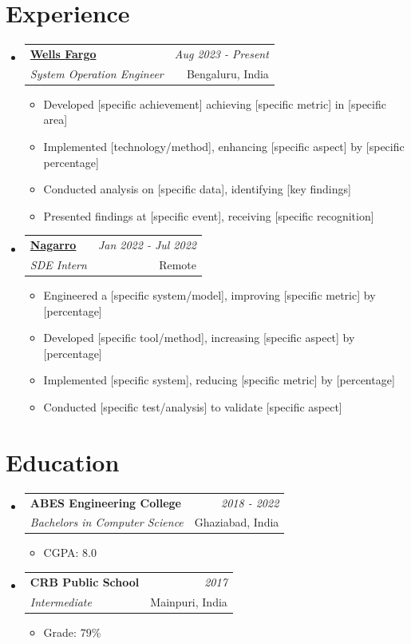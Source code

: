 \documentclass[a4paper,11pt]{article}
\makeatletter
\newcommand{\resumeSubheading}[4]{
\vspace{0.5mm}\item
    \begin{tabular*}{0.98\textwidth}[t]{l@{\extracolsep{\fill}}r}
        \textbf{#1} & \textit{#4} \\
        \textit{\footnotesize{#3}} &  \footnotesize{#2}\\
    \end{tabular*}
    \vspace{-2.4mm}
}
\newcommand{\resumeSubHeadingListStart}{\begin{itemize}[leftmargin=*,labelsep=1mm]}
\newcommand{\resumeItemListStart}{\begin{itemize}[leftmargin=*,labelsep=1mm,itemsep=0.5mm]}
\newcommand{\resumeSubHeadingListEnd}{\end{itemize}\vspace{2mm}}
\newcommand{\resumeItemListEnd}{\end{itemize}\vspace{-2mm}}
\makeatother
\begin{document}
\section{\textbf{Experience}}
\vspace{-0.4mm}
  \resumeSubHeadingListStart
  \resumeSubheading
      {\href{https://www.wellsfargo.com/}{Wells Fargo}}{Bengaluru, India}
      {System Operation Engineer}{Aug 2023 - Present}
      \resumeItemListStart
        \item Developed [specific achievement] achieving [specific metric] in [specific area]
        \item Implemented [technology/method], enhancing [specific aspect] by [specific percentage]
        \item Conducted analysis on [specific data], identifying [key findings]
        \item Presented findings at [specific event], receiving [specific recognition]
      \resumeItemListEnd 
  \resumeSubheading
    {\href{https://www.companyb.com}{Nagarro} }{Remote}
    {SDE Intern}{Jan 2022 - Jul 2022}
    \resumeItemListStart
      \item Engineered a [specific system/model], improving [specific metric] by [percentage]
      \item Developed [specific tool/method], increasing [specific aspect] by [percentage]
      \item Implemented [specific system], reducing [specific metric] by [percentage]
      \item Conducted [specific test/analysis] to validate [specific aspect]
    \resumeItemListEnd
  \resumeSubHeadingListEnd
\vspace{-6mm}

\section{\textbf{Education}}
\vspace{-0.4mm}
\resumeSubHeadingListStart

\resumeSubheading
{ABES Engineering College}{Ghaziabad, India}
{Bachelors in Computer Science}{2018 - 2022}
\resumeItemListStart
\item CGPA: 8.0
\resumeItemListEnd

\resumeSubheading
{CRB Public School}{Mainpuri, India}
{Intermediate}{2017}
\resumeItemListStart
\item Grade: 79\%
\resumeItemListEnd

\resumeSubHeadingListEnd
\vspace{-6mm}
\end{document}
